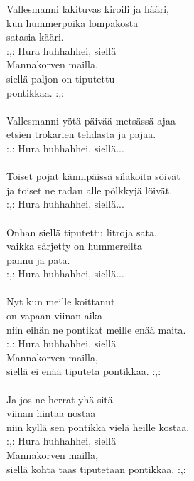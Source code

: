 
Vallesmanni lakituvas kiroili ja hääri, \\ kun hummerpoika lompakosta \\ satasia kääri. \\ :,: Hura huhhahhei, siellä \\ Mannakorven mailla, \\ siellä paljon on tiputettu \\ pontikkaa. :,: \\ \hspace{10mm} \\ Vallesmanni yötä päivää metsässä ajaa \\ etsien trokarien tehdasta ja pajaa. \\ :,: Hura huhhahhei, siellä... \\ \hspace{10mm} \\ Toiset pojat kännipäissä silakoita söivät \\ ja toiset ne radan alle pölkkyjä löivät. \\ :,: Hura huhhahhei, siellä... \\ \hspace{10mm} \\ Onhan siellä tiputettu litroja sata, \\ vaikka särjetty on hummereilta \\ pannu ja pata. \\ :,: Hura huhhahhei, siellä... \\ \hspace{10mm} \\ Nyt kun meille koittanut \\ on vapaan viinan aika \\ niin eihän ne pontikat meille enää maita. \\ :,: Hura huhhahhei, siellä \\ Mannakorven mailla, \\ siellä ei enää tiputeta pontikkaa. :,: \\ \hspace{10mm} \\ Ja jos ne herrat yhä sitä \\ viinan hintaa nostaa \\ niin kyllä sen pontikka vielä heille kostaa. \\ :,: Hura huhhahhei, siellä \\ Mannakorven mailla, \\ siellä kohta taas tiputetaan pontikkaa. :,: